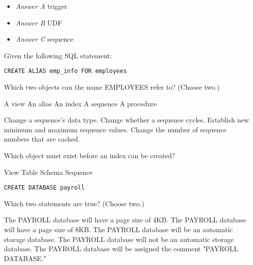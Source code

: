 \documentclass[answers, 11pt]{exam}
\begin{document}
\begin{questions}
\begin{solution}
	\begin{itemize}
		\item \textit{Answer A} trigger
		\item \textit{Answer B} UDF
		\item \textit{Answer C} sequence
	\end{itemize}
\end{solution}

\question[1]
Given the following SQL statement:
\begin{verbatim}
CREATE ALIAS emp_info FOR employees
\end{verbatim}
Which two objects can the name EMPLOYEES refer to? (Choose two.)
\begin{choices}
	\CorrectChoice A view
	\CorrectChoice An alias
	\choice An index
	\choice A sequence
	\choice A procedure
\end{choices}

\begin{choices}
	\CorrectChoice Change a sequence's data type.
	\choice Change whether a sequence cycles.
	\choice Establish new minimum and maximum sequence values.
	\choice Change the number of sequence numbers that are cached.
\end{choices}

\question[1]
Which object must exist before an index can be created?
\begin{choices}
	\choice View
	\CorrectChoice Table
	\choice Schema
	\choice Sequence
\end{choices}

\begin{verbatim}
CREATE DATABASE payroll
\end{verbatim}
Which two statements are true? (Choose two.)
\begin{choices}
	\CorrectChoice The PAYROLL database will have a page size of 4KB.
	\choice The PAYROLL database will have a page size of 8KB.
	\CorrectChoice The PAYROLL database will be an automatic storage database.
	\choice The PAYROLL database will not be an automatic storage database.
	\choice The PAYROLL database will be assigned the comment "PAYROLL DATABASE."
\end{choices}


\end{questions}
\end{document}
